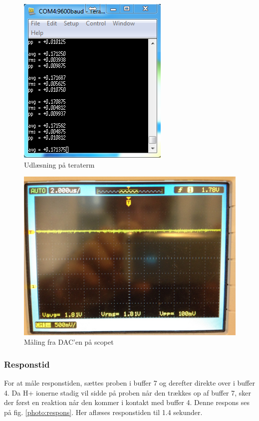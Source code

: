  \begin{figure}[H]
	\centering 
	\includegraphics[scale=1]{HardwareArkitektur/Sensore/pH_probe_billeder/stoj_teraterm.png}
	\caption{Udlæsning på teraterm}
	\label{photo:stoj_teraterm}
\end{figure} 

 \begin{figure}[H]
	\centering 
	\includegraphics[scale=0.9]{HardwareArkitektur/Sensore/pH_probe_billeder/stoj_oscilloscope.png}
	\caption{Måling fra DAC'en på scopet}
	\label{photo:stoj_scope}
\end{figure} 

\subsubsection{Responstid}
For at måle responstiden, sættes proben i buffer 7 og derefter direkte over i buffer 4. Da H+ ionerne stadig vil sidde på proben når den trækkes op af buffer 7, sker der først en reaktion når den kommer i kontakt med buffer 4. Denne respons ses på fig. \ref{photo:respons}. Her aflæses responstiden til 1.4 sekunder.

